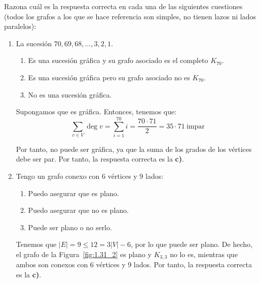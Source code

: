 \begin{ejercicio}\label{ej:1.31}
    Razona cuál es la respuesta correcta en cada una de las siguientes cuestiones (todos los grafos a los que se hace referencia son simples, no tienen lazos ni lados paralelos):
    \begin{enumerate}
        \item La sucesión $70, 69, 68, \ldots, 3, 2, 1$.
        \begin{enumerate}
            \item Es una sucesión gráfica y su grafo asociado es el completo $K_{70}$.
            \item Es una sucesión gráfica pero su grafo asociado no es $K_{70}$.
            \item No es una sucesión gráfica.
        \end{enumerate}

        Supongamos que es gráfica. Entonces, tenemos que:
        \begin{equation*}
            \sum_{v\in V}\deg v
            = \sum_{i=1}^{70}i
            = \frac{70\cdot 71}{2} = 35\cdot 71\ \text{impar}
        \end{equation*}

        Por tanto, no puede ser gráfica, ya que la suma de los grados de los vértices debe ser par. Por tanto, la respuesta correcta es la \textbf{c)}.

        \item\label{ej:1.31_2}
        Tengo un grafo conexo con 6 vértices y 9 lados:
        \begin{enumerate}
            \item Puedo asegurar que es plano.
            \item Puedo asegurar que no es plano.
            \item Puede ser plano o no serlo.
        \end{enumerate}

        Tenemos que $|E|=9\leq 12=3|V|-6$, por lo que puede ser plano. De hecho, el grafo de la Figura~\ref{fig:1.31_2} es plano y $K_{3,3}$ no lo es, mientras que ambos son conexos con 6 vértices y 9 lados. Por tanto, la respuesta correcta es la \textbf{c)}.
        \begin{figure}
            \centering
\end{figure}
\end{enumerate}
\end{ejercicio}
